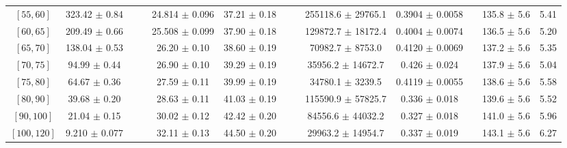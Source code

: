 \begin{tabular}{c||c|c|c|c|c|c|c|c|c|c|c||c}
$[55, 60]$ & 323.42 $\pm$ 0.84 &  &  & 24.814 $\pm$ 0.096 & 37.21 $\pm$ 0.18 &  &  & 255118.6 $\pm$ 29765.1 & 0.3904 $\pm$ 0.0058 &  & 135.8 $\pm$ 5.6 & 5.41\\
$[60, 65]$ & 209.49 $\pm$ 0.66 &  &  & 25.508 $\pm$ 0.099 & 37.90 $\pm$ 0.18 &  &  & 129872.7 $\pm$ 18172.4 & 0.4004 $\pm$ 0.0074 &  & 136.5 $\pm$ 5.6 & 5.20\\
$[65, 70]$ & 138.04 $\pm$ 0.53 &  &  & 26.20 $\pm$ 0.10 & 38.60 $\pm$ 0.19 &  &  & 70982.7 $\pm$ 8753.0 & 0.4120 $\pm$ 0.0069 &  & 137.2 $\pm$ 5.6 & 5.35\\
$[70, 75]$ & 94.99 $\pm$ 0.44 &  &  & 26.90 $\pm$ 0.10 & 39.29 $\pm$ 0.19 &  &  & 35956.2 $\pm$ 14672.7 & 0.426 $\pm$ 0.024 &  & 137.9 $\pm$ 5.6 & 5.04\\
$[75, 80]$ & 64.67 $\pm$ 0.36 &  &  & 27.59 $\pm$ 0.11 & 39.99 $\pm$ 0.19 &  &  & 34780.1 $\pm$ 3239.5 & 0.4119 $\pm$ 0.0055 &  & 138.6 $\pm$ 5.6 & 5.58\\
$[80, 90]$ & 39.68 $\pm$ 0.20 &  &  & 28.63 $\pm$ 0.11 & 41.03 $\pm$ 0.19 &  &  & 115590.9 $\pm$ 57825.7 & 0.336 $\pm$ 0.018 &  & 139.6 $\pm$ 5.6 & 5.52\\
$[90, 100]$ & 21.04 $\pm$ 0.15 &  &  & 30.02 $\pm$ 0.12 & 42.42 $\pm$ 0.20 &  &  & 84556.6 $\pm$ 44032.2 & 0.327 $\pm$ 0.018 &  & 141.0 $\pm$ 5.6 & 5.96\\
$[100, 120]$ & 9.210 $\pm$ 0.077 &  &  & 32.11 $\pm$ 0.13 & 44.50 $\pm$ 0.20 &  &  & 29963.2 $\pm$ 14954.7 & 0.337 $\pm$ 0.019 &  & 143.1 $\pm$ 5.6 & 6.27\\
\end{tabular}
